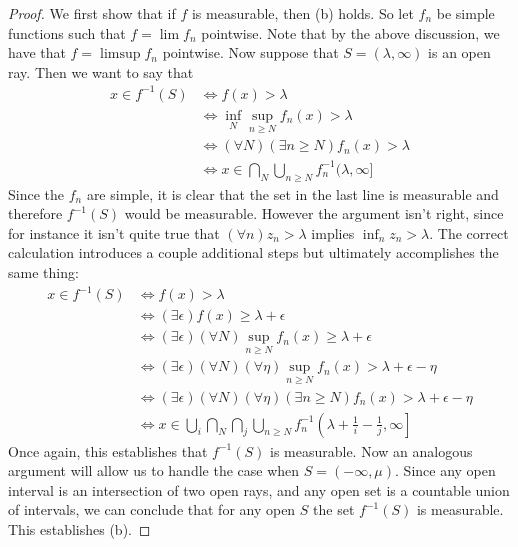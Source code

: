 \documentclass[10pt,oneside]{amsbook}
\theoremstyle{definition}
\theoremstyle{plain}
\theoremstyle{definition}
\theoremstyle{remark}
\numberwithin{equation}{section}
\numberwithin{figure}{section}
\begin{document}
\begin{proof}
  We first show that if $f$ is measurable, then (b) holds. So let $f_n$ be simple functions such that $f=\lim f_n$ pointwise. Note that by the above discussion, we have that $f=\limsup f_n$ pointwise. Now suppose that $S=(\lambda,\infty)$ is an open ray. Then we want to say that
  \begin{align*}
    x\in f^{-1}(S)&\iff f(x)>\lambda\\
          &\iff \inf_N\sup_{n\geq N}f_n(x)>\lambda\\
          &\iff (\forall N)(\exists n\geq N)f_n(x)>\lambda\\
          &\iff x\in\bigcap_N\bigcup_{n\geq N}f_n^{-1}(\lambda,\infty]
  \end{align*}
  Since the $f_n$ are simple, it is clear that the set in the last line is measurable and therefore $f^{-1}(S)$ would be measurable. However the argument isn't right, since for instance it isn't quite true that $(\forall n)z_n>\lambda$ implies $\inf_n z_n>\lambda$. The correct calculation introduces a couple additional steps but ultimately accomplishes the same thing:
  \begin{align*}
    x\in f^{-1}(S)&\iff f(x)>\lambda\\
          &\iff (\exists\epsilon)f(x)\geq \lambda+\epsilon\\
          &\iff (\exists\epsilon)(\forall N)\sup_{n\geq N} f_n(x)\geq\lambda+\epsilon\\
          &\iff (\exists\epsilon)(\forall N)(\forall\eta)\sup_{n\geq N}f_n(x)>\lambda+\epsilon-\eta\\
          &\iff (\exists\epsilon)(\forall N)(\forall\eta)(\exists n\geq N)f_n(x)>\lambda+\epsilon-\eta\\
          &\iff x\in\bigcup_i\bigcap_N\bigcap_j\bigcup_{n\geq N}f_n^{-1}\left(\lambda+\frac1i-\frac1j,\infty\right]
  \end{align*}
  Once again, this establishes that $f^{-1}(S)$ is measurable. Now an analogous argument will allow us to handle the case when $S=(-\infty,\mu)$. Since any open interval is an intersection of two open rays, and any open set is a countable union of intervals, we can conclude that for any open $S$ the set $f^{-1}(S)$ is measurable. This establishes (b).


\end{proof}
\end{document}
